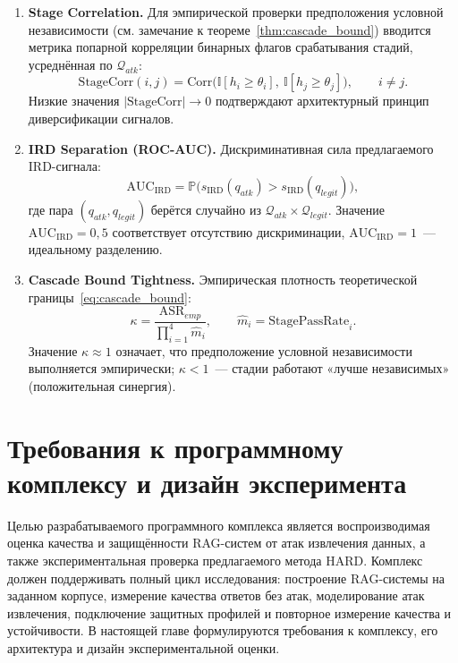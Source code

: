 \documentclass[12pt, a4paper]{article}
\theoremstyle{definition}
\theoremstyle{remark}
\begin{document}
\begin{enumerate}
    \item \textbf{Stage Correlation.} Для эмпирической проверки предположения условной независимости (см. замечание к теореме~\ref{thm:cascade_bound}) вводится метрика попарной корреляции бинарных флагов срабатывания стадий, усреднённая по $\mathcal{Q}_{atk}$:
    \begin{equation}
        \label{eq:stage_corr}
        \mathrm{StageCorr}(i, j) = \mathrm{Corr}\!\bigl(\mathbb{I}[h_i \ge \theta_i],\ \mathbb{I}[h_j \ge \theta_j]\bigr), \qquad i \ne j.
    \end{equation}
    Низкие значения $|\mathrm{StageCorr}| \to 0$ подтверждают архитектурный принцип диверсификации сигналов.

    \item \textbf{IRD Separation (ROC-AUC).} Дискриминативная сила предлагаемого IRD-сигнала:
    \begin{equation}
        \label{eq:auc_ird}
        \mathrm{AUC}_{\text{IRD}} = \mathbb{P}\bigl(s_{\text{IRD}}(q_{atk}) > s_{\text{IRD}}(q_{legit})\bigr),
    \end{equation}
    где пара $(q_{atk}, q_{legit})$ берётся случайно из $\mathcal{Q}_{atk} \times \mathcal{Q}_{legit}$. Значение $\mathrm{AUC}_{\text{IRD}} = 0{,}5$ соответствует отсутствию дискриминации, $\mathrm{AUC}_{\text{IRD}} = 1$~--- идеальному разделению.

    \item \textbf{Cascade Bound Tightness.} Эмпирическая плотность теоретической границы~\eqref{eq:cascade_bound}:
    \begin{equation}
        \label{eq:kappa}
        \kappa = \frac{\mathrm{ASR}_{emp}}{\prod_{i=1}^{4} \widehat{m}_i}, \qquad \widehat{m}_i = \mathrm{StagePassRate}_i.
    \end{equation}
    Значение $\kappa \approx 1$ означает, что предположение условной независимости выполняется эмпирически; $\kappa < 1$~--- стадии работают «лучше независимых» (положительная синергия).
\end{enumerate}

\newpage
\section{Требования к программному комплексу и дизайн эксперимента}
\label{sec:software_complex}

Целью разрабатываемого программного комплекса является воспроизводимая оценка качества и защищённости RAG-систем от атак извлечения данных, а также экспериментальная проверка предлагаемого метода HARD. Комплекс должен поддерживать полный цикл исследования: построение RAG-системы на заданном корпусе, измерение качества ответов без атак, моделирование атак извлечения, подключение защитных профилей и повторное измерение качества и устойчивости. В настоящей главе формулируются требования к комплексу, его архитектура и дизайн экспериментальной оценки.
\end{document}
